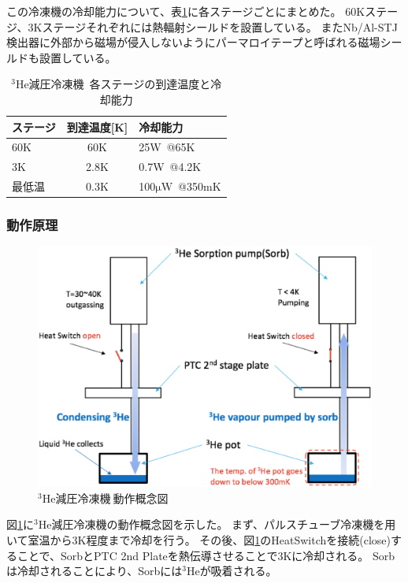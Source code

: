 				この冷凍機の冷却能力について、表\ref{tab:He3_sorption}に各ステージごとにまとめた。
				60Kステージ、3Kステージそれぞれには熱輻射シールドを設置している。
				またNb/Al-STJ検出器に外部から磁場が侵入しないようにパーマロイテープと呼ばれる磁場シールドも設置している。
				\begin{table}[htb]
					\begin{center}
						\begin{tabular}{| l | c | l |} \hline
							ステージ & 到達温度[K] & 冷却能力 \\ \hline
							60K & 60K & 25W\ @65K \\
							3K & 2.8K & 0.7W\ @4.2K \\
							最低温 & 0.3K & 100$\mathrm{\mu W}$\ @350mK \\ \hline
						\end{tabular}
						\caption{$\mathrm{^{3}He}$減圧冷凍機\ 各ステージの到達温度と冷却能力}
						\label{tab:He3_sorption}
					\end{center}
				\end{table}
				
				\clearpage
			
			\subsubsection{動作原理}
				\begin{figure}[htbp]
					\begin{center}
						\includegraphics[width=12.0cm]{./Chapter/Chapter4/Picture/He3sorption.eps}
						\caption{$\mathrm{^{3}He減圧冷凍機\ 動作概念図}$}
						\label{fig:He3sorption}
					\end{center}
				\end{figure}
				図\ref{fig:He3sorption}に$\mathrm{^{3}He}$減圧冷凍機の動作概念図を示した。
				まず、パルスチューブ冷凍機を用いて室温から3K程度まで冷却を行う。
				その後、図\ref{fig:He3sorption}のHeatSwitchを接続(close)することで、SorbとPTC 2nd Plateを熱伝導させることで3Kに冷却される。
				Sorbは冷却されることにより、Sorbには$\mathrm{^{3}He}$が吸着される。
				
